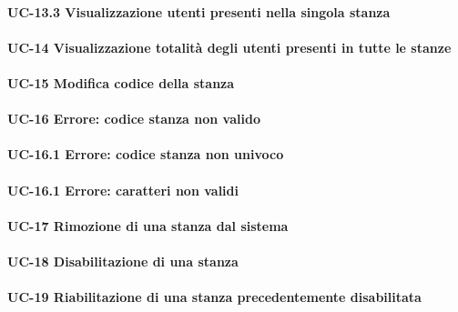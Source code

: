     \paragraph{UC-13.3 Visualizzazione utenti presenti nella singola stanza}

\paragraph{UC-14 Visualizzazione totalità degli utenti presenti in tutte le stanze}

\paragraph{UC-15 Modifica codice della stanza}

\paragraph{UC-16 Errore: codice stanza non valido}

    \paragraph{UC-16.1 Errore: codice stanza non univoco}
    
    \paragraph{UC-16.1 Errore: caratteri non validi}

 
\paragraph{UC-17 Rimozione di una stanza dal sistema}

\paragraph{UC-18 Disabilitazione di una stanza}

\paragraph{UC-19 Riabilitazione di una stanza precedentemente disabilitata}